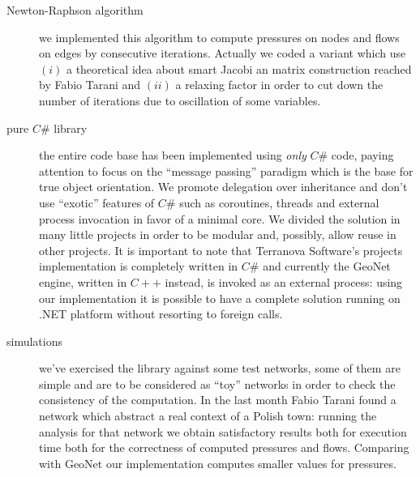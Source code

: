 \documentclass[twoside,openright,titlepage,fleqn,
headinclude,11pt,a4paper,BCOR5mm,footinclude ]{scrbook}
\begin{document}
\begin{description}
\item[Newton-Raphson algorithm] we implemented this algorithm to compute
pressures on nodes and flows on edges by consecutive iterations. 
Actually we coded a variant which use
$(i)$ a theoretical idea about smart Jacobi an matrix construction reached by Fabio
Tarani and $(ii)$ a relaxing factor in order to cut down the number of
iterations due to oscillation of some variables.

\item[pure $C\#$ library] the entire code base has been implemented using
\emph{only} $C\#$ code, paying attention to focus on the ``message passing''
paradigm which is the base for true object orientation. We promote delegation
over inheritance and don't use ``exotic'' features of $C\#$
such as coroutines, threads and external process invocation in favor of a 
minimal core. We divided the solution in many little projects in order to be 
modular and, possibly, allow reuse in other projects. It is important to note that
Terranova Software's projects implementation is completely written in $C\#$ and
currently the GeoNet engine, written in $C++$ instead, is invoked as an external
process: using our implementation it is possible to have a complete solution running 
on .NET platform without resorting to foreign calls.

\item[simulations] we've exercised the library against some test networks, some
of them are simple and are to be considered as ``toy'' networks in order to
check the consistency of the computation. In the last month Fabio Tarani found a
network which abstract a real context of a Polish town: running the analysis for
that network we obtain satisfactory results both for execution time both for the
correctness of computed pressures and flows. Comparing with GeoNet our
implementation computes smaller values for pressures.
\end{description}
\end{document}

